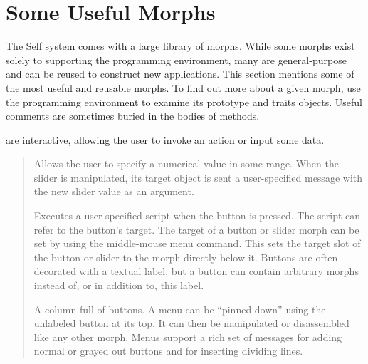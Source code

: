 \documentclass[letterpaper,10pt,english]{sphinxmanual}
\begin{document}
\section{Some Useful Morphs}
\label{\detokenize{morphic:some-useful-morphs}}
The Self system comes with a large library of morphs. While some morphs exist solely to supporting the programming environment, many are general-purpose and can be reused to construct new applications. This section mentions some of the most useful and reusable morphs. To find out more about a given morph, use the programming environment to examine its prototype and traits objects. Useful comments are sometimes buried in the bodies of methods.

 are interactive, allowing the user to invoke an action or input some data.
\begin{quote}

 Allows the user to specify a numerical value in some range. When the slider is manipulated, its target object is sent a user-specified message with the new slider value as an argument.

 Executes a user-specified script when the button is pressed. The script can refer to the button's target. The target of a button or slider morph can be set by using the middle-mouse menu  command. This sets the target slot of the button or slider to the morph directly below it. Buttons are often decorated with a textual label, but a button can contain arbitrary morphs instead of, or in addition to, this label.

 A column full of buttons. A menu can be “pinned down” using the unlabeled button at its top. It can then be manipulated or disassembled like any other morph. Menus support a rich set of messages for adding normal or grayed out buttons and for inserting dividing lines.
\end{quote}
\end{document}

